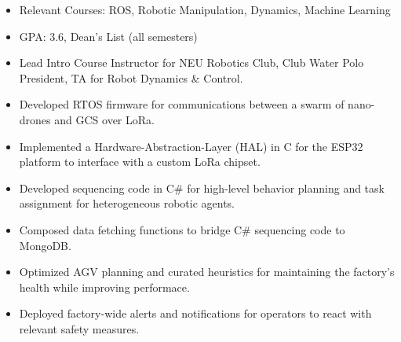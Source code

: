 \documentclass[10pt,a4paper,ragged2e,withhyper]{altacv}
\begin{document}
\tagline{}
\makecvheader


    \vspace{-1.8em}
    \begin{itemize}
        \item Relevant Courses: ROS, Robotic Manipulation, Dynamics, Machine Learning
    \end{itemize}
    \begin{itemize}
        \item GPA: 3.6, Dean's List (all semesters)
        \item Lead Intro Course Instructor for NEU Robotics Club, Club Water Polo President, TA for Robot Dynamics \& Control.
    \end{itemize}
    \vspace{-1.4em}
    \begin{itemize}
        \item Developed RTOS firmware for communications between a swarm of nano-drones and GCS over LoRa.
        \item Implemented a Hardware-Abstraction-Layer (HAL) in C for the ESP32 platform to interface with a custom LoRa chipset.
    \end{itemize}
    \begin{itemize}
        \item Developed sequencing code in C\# for high-level behavior planning and task assignment for heterogeneous robotic agents.
        \item Composed data fetching functions to bridge C\# sequencing code to MongoDB.
        \item Optimized AGV planning and curated heuristics for maintaining the factory's health while improving performace.
        \item Deployed factory-wide alerts and notifications for operators to react with relevant safety measures.
    \end{itemize}
\end{document}
